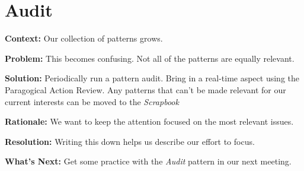 \section{Audit}

\textbf{Context:} Our collection of patterns grows.

\textbf{Problem:} This becomes confusing.  Not all of the patterns are equally relevant.

\textbf{Solution:} Periodically run a pattern audit.  Bring in a real-time aspect using the Paragogical Action Review.  Any patterns that can't be made relevant for our current interests can be moved to the \emph{Scrapbook}

\textbf{Rationale:} We want to keep the attention focused on the most relevant issues.

\textbf{Resolution:} Writing this down helps us describe our effort to focus.

\textbf{What's Next:} Get some practice with the \emph{Audit} pattern in our next meeting.